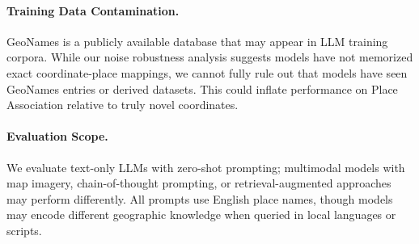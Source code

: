 \paragraph{Training Data Contamination.}
GeoNames is a publicly available database that may appear in LLM training corpora. While our noise robustness analysis suggests models have not memorized exact coordinate-place mappings, we cannot fully rule out that models have seen GeoNames entries or derived datasets. This could inflate performance on Place Association relative to truly novel coordinates.

\paragraph{Evaluation Scope.}
We evaluate text-only LLMs with zero-shot prompting; multimodal models with map imagery, chain-of-thought prompting, or retrieval-augmented approaches may perform differently. All prompts use English place names, though models may encode different geographic knowledge when queried in local languages or scripts.
